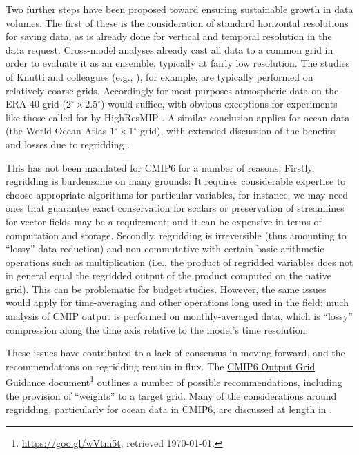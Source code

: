 \documentclass[gmd,manuscript]{copernicus}
\newcommand{\urlref}[2] {\href{#1}{#2}\footnote{\url{#1}, retrieved \today.}}
\begin{document}
Two further steps have been proposed toward ensuring sustainable
growth in data volumes.
The first of these is the consideration of standard horizontal
resolutions for saving data, as is already done for vertical and
temporal resolution in the data request. Cross-model analyses already
cast all data to a common grid in order to evaluate it as an ensemble,
typically at fairly low resolution. The studies of Knutti and
colleagues (e.g., \cite{ref:knuttietal2017}), for example, are typically performed
on relatively coarse grids. Accordingly for most purposes
atmospheric data on the ERA-40 grid ($2^\circ\times 2.5^\circ$) would
suffice, with obvious exceptions for experiments like those called
for by HighResMIP \citep{ref:haarsmaetal2016}. A similar
conclusion applies for ocean data (the World Ocean Atlas
$1^\circ\times 1^\circ$ grid), with extended discussion of the
benefits and losses due to regridding
\citep[see][]{ref:griffiesetal2014,ref:griffiesetal2016}.

This has not been mandated for CMIP6 for a number of reasons. Firstly,
regridding is burdensome on many grounds: It requires considerable
expertise to choose appropriate algorithms for particular variables,
for instance, we may need ones that guarantee exact conservation for
scalars or preservation of streamlines for vector fields may be a
requirement; and it can be expensive in terms of computation and
storage. Secondly, regridding is irreversible (thus amounting to
``lossy'' data reduction) and non-commutative with certain basic
arithmetic operations such as multiplication (i.e., the product of
regridded variables does not in general equal the regridded output of
the product computed on the native grid). This can be problematic for
budget studies. However, the same issues would apply for
time-averaging and other operations long used in the field: much
analysis of CMIP output is performed on monthly-averaged data, which
is ``lossy'' compression along the time axis relative to the model's
time resolution.

These issues have contributed to a lack of consensus in moving forward,
and the recommendations on regridding remain in flux. The
\urlref{https://goo.gl/wVtm5t}{CMIP6 Output Grid Guidance document}
outlines a number of possible recommendations, including the provision
of ``weights'' to a target grid. Many of the considerations around
regridding, particularly for ocean data in CMIP6, are discussed at
length in \cite{ref:griffiesetal2016}. 
\end{document}

